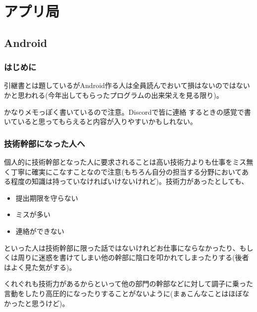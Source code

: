 \documentclass[dvipdfmx,jb5]{jarticle}
\begin{document}
 \newpage
 \section{アプリ局}
 \subsection{Android}
 \subsubsection{はじめに}
 引継書とは題しているがAndroid作る人は全員読んでおいて損はないのではないかと思われる(今年出してもらったプログラムの出来栄えを見る限り)。\par
かなりメモっぽく書いているので注意。Discordで皆に連絡
するときの感覚で書いていると思ってもらえると内容が入りやすいかもしれない。
 \subsubsection{技術幹部になった人へ}
 個人的に技術幹部となった人に要求されることは高い技術力よりも仕事をミス無く丁寧に確実にこなすことなので注意(もちろん自分の担当する分野においてある程度の知識は持っていなければいけないけれど)。技術力があったとしても、
 \begin{itemize}
 \item 提出期限を守らない
 \item ミスが多い
 \item 連絡ができない
 \end{itemize}
 といった人は技術幹部に限った話ではないけれどお仕事にならなかったり、もしくは周りに迷惑を書けてしまい他の幹部に陰口を叩かれてしまったりする(後者はよく見た気がする)。\par
くれぐれも技術力があるからといって他の部門の幹部などに対して調子に乗った言動をしたり高圧的になったりすることがないように(まぁこんなことはほぼなかったと思うけど)。
\end{document}
